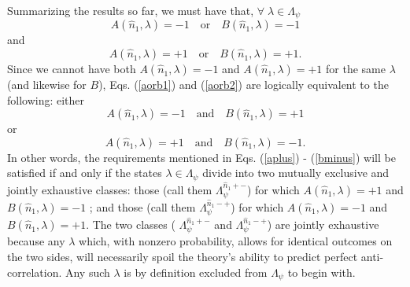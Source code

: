 \documentclass[aps,prc,onecolumn,12pt,nofootinbib]{revtex4-2}
\begin{document}
Summarizing the results so far, we must have that,
$\forall \; \lambda \in \Lambda_\psi$
\begin{equation}
A(\hat{n}_1, \lambda) = -1 \quad {\mathrm{or}} \quad
B(\hat{n}_1,\lambda) = -1
\label{aorb1}
\end{equation}
and
\begin{equation}
A(\hat{n}_1,\lambda) = +1 \quad {\mathrm{or}} \quad
B(\hat{n}_1,\lambda) = +1.
\label{aorb2}
\end{equation}
Since we cannot have both $A(\hat{n}_1,\lambda)=-1$ and
$A(\hat{n}_1,\lambda)=+1$ for the same $\lambda$ (and likewise for
$B$), Eqs. (\ref{aorb1}) and (\ref{aorb2}) are logically
equivalent to the following:  either
\begin{equation}
A(\hat{n}_1,\lambda) = -1 \quad {\mathrm{and}} \quad
B(\hat{n}_1,\lambda) = +1
\end{equation}
or
\begin{equation}
A(\hat{n}_1,\lambda) = +1 \quad {\mathrm{and}} \quad
B(\hat{n}_1,\lambda) = -1.
\end{equation}
In other words, the requirements mentioned in Eqs.
(\ref{aplus}) - (\ref{bminus}) will be satisfied if and only if the
states $\lambda \in \Lambda_\psi$ divide into two mutually
exclusive and jointly exhaustive classes:  those (call them
$ \Lambda^{  \hat{n}_1 + - }_\psi $) for which
$A(\hat{n}_1,\lambda) = +1$ and $B(\hat{n}_1,\lambda)=-1$ ;
and those (call them $\Lambda^{\hat{n}_1 - + }_\psi $) for which
$A(\hat{n}_1,\lambda) = -1$ and $B(\hat{n}_1,\lambda)=+1$.
The two classes ( $\Lambda^{\hat{n}_1 + - }_\psi $ and
$\Lambda^{\hat{n}_1 - + }_\psi  $) are jointly exhaustive
because any $\lambda$ which, with nonzero probability, allows for
identical outcomes on the two sides, will necessarily spoil the
theory's ability to predict perfect anti-correlation.  Any such
$\lambda$ is by definition excluded from $\Lambda_\psi$ to begin
with.
\end{document}
